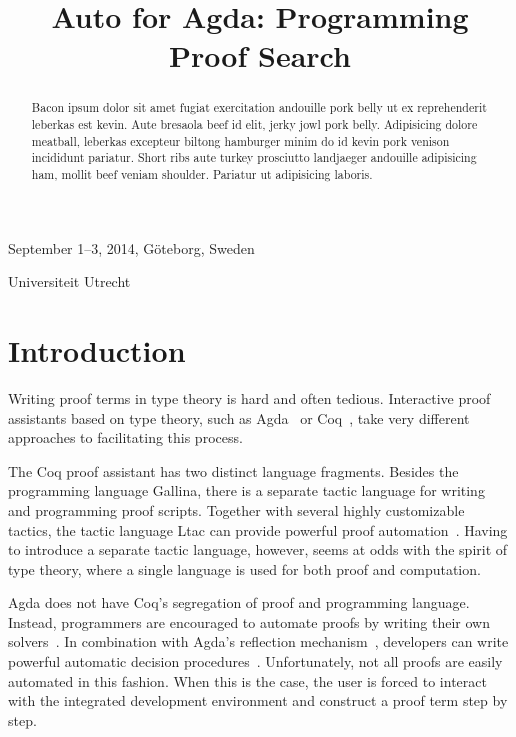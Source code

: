 \documentclass[preprint]{sigplanconf}
\begin{document}
 {September 1--3, 2014, G\"oteborg, Sweden}

\title{Auto for Agda: Programming Proof Search}

           {Universiteit Utrecht}
           {}
\maketitle



\begin{abstract}
Bacon ipsum dolor sit amet fugiat exercitation andouille pork belly ut ex
reprehenderit leberkas est kevin. Aute bresaola beef id elit, jerky jowl pork
belly. Adipisicing dolore meatball, leberkas excepteur biltong hamburger minim
do id kevin pork venison incididunt pariatur. Short ribs aute turkey prosciutto
landjaeger andouille adipisicing ham, mollit beef veniam shoulder. Pariatur ut
adipisicing laboris.
\end{abstract}



\section{Introduction}
\label{sec:intro}

Writing proof terms in type theory is hard and often tedious.
Interactive proof assistants based on type theory, such as
Agda~\cite{agda} or Coq~\cite{coq}, take
very different approaches to facilitating this process.

The Coq proof assistant has two distinct language fragments. Besides the
programming language Gallina, there is a separate tactic language for
writing and programming proof scripts. Together with several highly
customizable tactics, the tactic language Ltac can provide powerful
proof automation~\cite{chlipala}. Having to introduce a
separate tactic language, however, seems at odds with the spirit of type
theory, where a single language is used for both proof and computation.

Agda does not have Coq's segregation of proof and programming language.
Instead, programmers are encouraged to automate proofs by writing their
own solvers~\cite{ulf-tphols}. In combination with
Agda's reflection mechanism~\cite{van-der-walt},
developers can write powerful automatic decision
procedures~\cite{allais}. Unfortunately, not all proofs
are easily automated in this fashion. When this is the case, the user is
forced to interact with the integrated development environment and
construct a proof term step by step.
\end{document}
